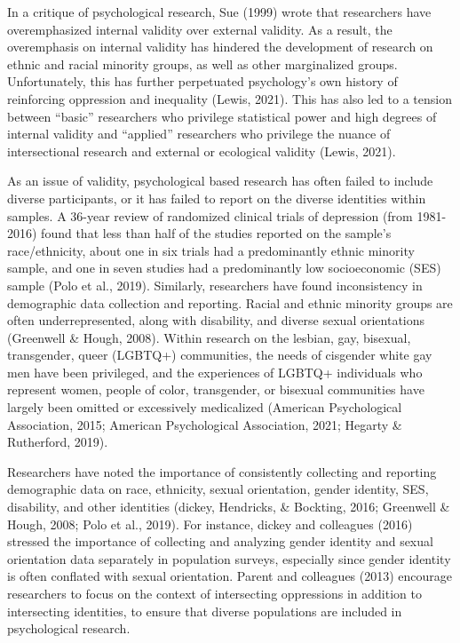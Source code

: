 \documentclass[
  11pt,
]{book}
\begin{document}
In a critique of psychological research, Sue (1999) wrote that researchers have overemphasized internal validity over external validity. As a result, the overemphasis on internal validity has hindered the development of research on ethnic and racial minority groups, as well as other marginalized groups. Unfortunately, this has further perpetuated psychology's own history of reinforcing oppression and inequality (Lewis, 2021). This has also led to a tension between ``basic'' researchers who privilege statistical power and high degrees of internal validity and ``applied'' researchers who privilege the nuance of intersectional research and external or ecological validity (Lewis, 2021).

As an issue of validity, psychological based research has often failed to include diverse participants, or it has failed to report on the diverse identities within samples. A 36-year review of randomized clinical trials of depression (from 1981-2016) found that less than half of the studies reported on the sample's race/ethnicity, about one in six trials had a predominantly ethnic minority sample, and one in seven studies had a predominantly low socioeconomic (SES) sample (Polo et al., 2019). Similarly, researchers have found inconsistency in demographic data collection and reporting. Racial and ethnic minority groups are often underrepresented, along with disability, and diverse sexual orientations (Greenwell \& Hough, 2008). Within research on the lesbian, gay, bisexual, transgender, queer (LGBTQ+) communities, the needs of cisgender white gay men have been privileged, and the experiences of LGBTQ+ individuals who represent women, people of color, transgender, or bisexual communities have largely been omitted or excessively medicalized (American Psychological Association, 2015; American Psychological Association, 2021; Hegarty \& Rutherford, 2019).

Researchers have noted the importance of consistently collecting and reporting demographic data on race, ethnicity, sexual orientation, gender identity, SES, disability, and other identities (dickey, Hendricks, \& Bockting, 2016; Greenwell \& Hough, 2008; Polo et al., 2019). For instance, dickey and colleagues (2016) stressed the importance of collecting and analyzing gender identity and sexual orientation data separately in population surveys, especially since gender identity is often conflated with sexual orientation. Parent and colleagues (2013) encourage researchers to focus on the context of intersecting oppressions in addition to intersecting identities, to ensure that diverse populations are included in psychological research.
\end{document}

